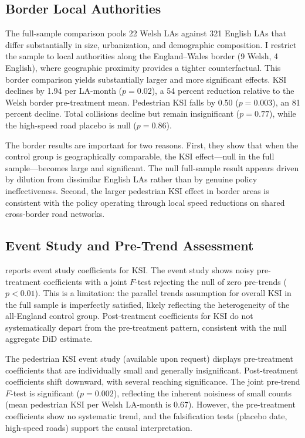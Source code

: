 \documentclass[12pt]{article}
\begin{document}
\subsection{Border Local Authorities}

The full-sample comparison pools 22 Welsh LAs against 321 English LAs that differ substantially in size, urbanization, and demographic composition. I restrict the sample to local authorities along the England--Wales border (9 Welsh, 4 English), where geographic proximity provides a tighter counterfactual. This border comparison yields substantially larger and more significant effects. KSI declines by 1.94 per LA-month ($p = 0.02$), a 54 percent reduction relative to the Welsh border pre-treatment mean. Pedestrian KSI falls by 0.50 ($p = 0.003$), an 81 percent decline. Total collisions decline but remain insignificant ($p = 0.77$), while the high-speed road placebo is null ($p = 0.86$).

The border results are important for two reasons. First, they show that when the control group is geographically comparable, the KSI effect---null in the full sample---becomes large and significant. The null full-sample result appears driven by dilution from dissimilar English LAs rather than by genuine policy ineffectiveness. Second, the larger pedestrian KSI effect in border areas is consistent with the policy operating through local speed reductions on shared cross-border road networks.

\subsection{Event Study and Pre-Trend Assessment}

 reports event study coefficients for KSI. The event study shows noisy pre-treatment coefficients with a joint $F$-test rejecting the null of zero pre-trends ($p < 0.01$). This is a limitation: the parallel trends assumption for overall KSI in the full sample is imperfectly satisfied, likely reflecting the heterogeneity of the all-England control group. Post-treatment coefficients for KSI do not systematically depart from the pre-treatment pattern, consistent with the null aggregate DiD estimate.

The pedestrian KSI event study (available upon request) displays pre-treatment coefficients that are individually small and generally insignificant. Post-treatment coefficients shift downward, with several reaching significance. The joint pre-trend $F$-test is significant ($p = 0.002$), reflecting the inherent noisiness of small counts (mean pedestrian KSI per Welsh LA-month is 0.67). However, the pre-treatment coefficients show no systematic trend, and the falsification tests (placebo date, high-speed roads) support the causal interpretation.
\end{document}

